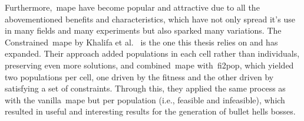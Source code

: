 
Furthermore,~\acrshort{mape} have become popular and attractive due to all the abovementioned benefits and characteristics, which have not only spread it's use in many fields and many experiments but also sparked many variations. The Constrained~\acrshort{mape} by Khalifa et al.~\cite{khalifa_talakat_2018} is the one this thesis relies on and has expanded. Their approach added populations in each cell rather than individuals, preserving even more solutions, and combined~\acrshort{mape} with~\acrshort{fi2pop}, which yielded two populations per cell, one driven by the fitness and the other driven by satisfying a set of constraints. Through this, they applied the same process as with the vanilla~\acrshort{mape} but per population (i.e., feasible and infeasible), which resulted in useful and interesting results for the generation of bullet hells bosses.

